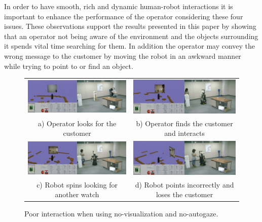 \documentclass[journal]{IEEEtran}
\begin{document}
In order to have smooth, rich and dynamic human-robot interactions it is important to enhance the performance of the operator considering these four issues. 
These observations support the results presented in this paper by showing that an operator not being aware of the environment and the objects surrounding it spends vital time searching for them.
In addition the operator may convey the wrong message to the customer by moving the robot in an awkward manner while trying to point to or find an object.

\begin{figure}[t]
\centering
\begin{tabular}{@{}cc@{}}
\includegraphics[width=\columnwidth]{figs/nopNaTogether_1} &
\includegraphics[width=\columnwidth]{figs/nopNaTogether_2}\\
a) Operator looks for the customer &
b) Operator finds the customer and interacts\\
\includegraphics[width=\columnwidth]{figs/nopNaTogether_3} &
\includegraphics[width=\columnwidth]{figs/nopNaTogether_4}\\
c) Robot spins looking for another watch &
d) Robot points incorrectly and loses the customer
\end{tabular}
\caption{Poor interaction when using no-visualization and no-autogaze.}
\label{fig:nopNaTogether}
\end{figure}
\end{document}
